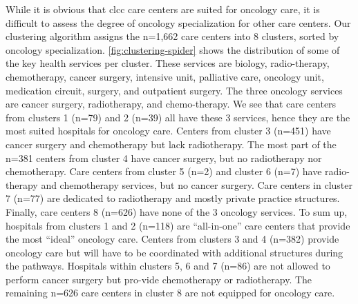 While it is obvious that \ac{clcc} care centers are suited for oncology care, it is difficult to assess the degree of oncology specialization for other care centers. Our clustering algorithm assigns the n=1,662 care centers into 8 clusters, sorted by oncology specialization. \cref{fig:clustering-spider} shows the distribution of some of the key health services per cluster. These services are biology, radio-therapy, chemotherapy, cancer surgery, intensive unit, palliative care, oncology unit, medication circuit, surgery, and outpatient surgery. The three oncology services are cancer surgery, radiotherapy, and chemo-therapy. We see that care centers from clusters 1 (n=79) and 2 (n=39) all have these 3 services, hence they are the most suited hospitals for oncology care. Centers from cluster 3 (n=451) have cancer surgery and chemotherapy but lack radiotherapy. The most part of the n=381 centers from cluster 4 have cancer surgery, but no radiotherapy nor chemotherapy. Care centers from cluster 5 (n=2) and cluster 6 (n=7) have radio-therapy and chemotherapy services, but no cancer surgery. Care centers in cluster 7 (n=77) are dedicated to radiotherapy and mostly private practice structures. Finally, care centers 8 (n=626) have none of the 3 oncology services. To sum up, hospitals from clusters 1 and 2 (n=118) are “all-in-one” care centers that provide the most “ideal” oncology care. Centers from clusters 3 and 4 (n=382) provide oncology care but will have to be coordinated with additional structures during the pathways. Hospitals within clusters 5, 6 and 7 (n=86) are not allowed to perform cancer surgery but pro-vide chemotherapy or radiotherapy. The remaining n=626 care centers in cluster 8 are not equipped for oncology care.

